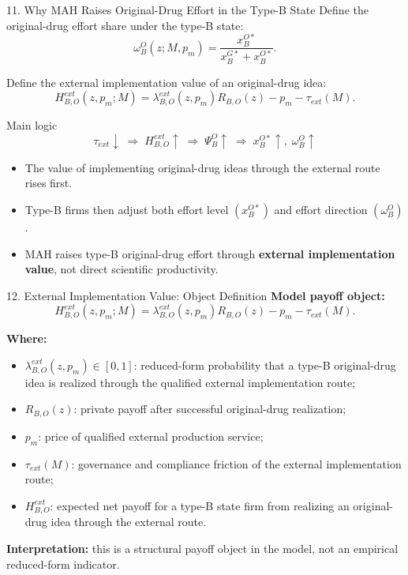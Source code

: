 \documentclass[aspectratio=169,11pt]{beamer}
\begin{document}
\begin{frame}{11. Why MAH Raises Original-Drug Effort in the Type-B State}
\small
Define the original-drug effort share under the type-B state:
\[
\omega_B^O(z;M,p_m)=
\frac{x_B^{O*}}{x_B^{G*}+x_B^{O*}}.
\]

Define the external implementation value of an original-drug idea:
\[
H_{B,O}^{ext}(z,p_m;M)=
\lambda_{B,O}^{ext}(z,p_m)R_{B,O}(z)-p_m-\tau_{ext}(M).
\]

\begin{block}{Main logic}
\[
\tau_{ext}\downarrow
\;\Rightarrow\;
H_{B,O}^{ext}\uparrow
\;\Rightarrow\;
\Psi_B^O\uparrow
\;\Rightarrow\;
x_B^{O*}\uparrow,\;\omega_B^O\uparrow
\]
\end{block}

\begin{itemize}
    \item The value of implementing original-drug ideas through the external route rises first.
    \item Type-B firms then adjust both effort level \((x_B^{O*})\) and effort direction \((\omega_B^O)\).
    \item MAH raises type-B original-drug effort through \textbf{external implementation value}, not direct scientific productivity.
\end{itemize}
\end{frame}

\begin{frame}{12. External Implementation Value: Object Definition}
\small
\textbf{Model payoff object:}
\[
H_{B,O}^{ext}(z,p_m;M)=
\lambda_{B,O}^{ext}(z,p_m)R_{B,O}(z)-p_m-\tau_{ext}(M).
\]

\textbf{Where:}
\begin{itemize}
    \item \(\lambda_{B,O}^{ext}(z,p_m)\in[0,1]\): reduced-form probability that a type-B original-drug idea is realized through the qualified external implementation route;
    \item \(R_{B,O}(z)\): private payoff after successful original-drug realization;
    \item \(p_m\): price of qualified external production service;
    \item \(\tau_{ext}(M)\): governance and compliance friction of the external implementation route;
    \item \(H_{B,O}^{ext}\): expected net payoff for a type-B state firm from realizing an original-drug idea through the external route.
\end{itemize}

\vspace{0.1cm}
\textbf{Interpretation:} this is a structural payoff object in the model, not an empirical reduced-form indicator.
\end{frame}
\end{document}
